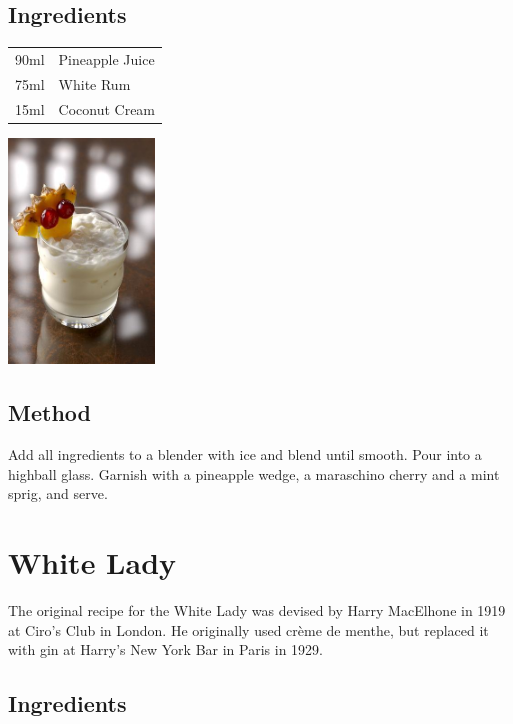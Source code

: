 \documentclass[12pt, letterpaper]{article}
\begin{document}
\subsection*{Ingredients}

\begin{multicols}{2}

\begin{tabular} { r | l}
    90ml & Pineapple Juice \\
    75ml & White Rum \\
    15ml & Coconut Cream
\end{tabular}

\includegraphics[height=6cm]{bahia}

\end{multicols}

\subsection*{Method}
Add all ingredients to a blender with ice and blend until smooth. Pour into a highball glass.
Garnish with a pineapple wedge, a maraschino cherry and a mint sprig, and serve.

\pagebreak

\section{White Lady}
The original recipe for the White Lady was devised by Harry MacElhone in 1919 at Ciro's Club in London.
He originally used crème de menthe, but replaced it with gin at Harry's New York Bar in Paris in 1929.

\subsection*{Ingredients}
\end{document}
